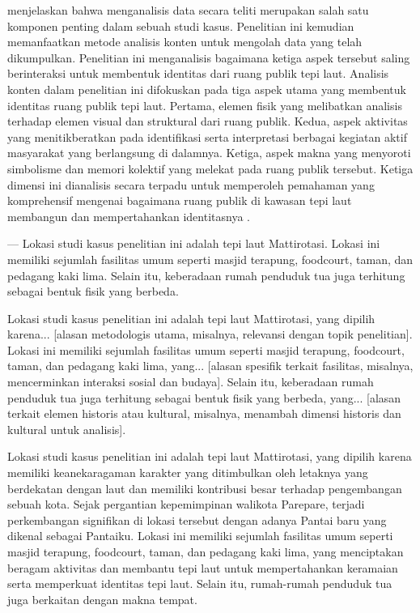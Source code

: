\documentclass[11pt]{simart} %
\begin{document}
\cite{wiraguna2024}  menjelaskan bahwa menganalisis data secara teliti merupakan salah satu komponen penting dalam sebuah studi kasus.
Penelitian ini kemudian memanfaatkan metode analisis konten untuk mengolah data yang telah dikumpulkan. Penelitian ini menganalisis bagaimana ketiga aspek tersebut saling berinteraksi untuk membentuk identitas dari ruang publik tepi laut.
Analisis konten dalam penelitian ini difokuskan pada tiga aspek utama yang membentuk identitas ruang publik tepi laut.
Pertama, elemen fisik yang melibatkan analisis terhadap elemen visual dan struktural dari ruang publik.
Kedua, aspek aktivitas yang menitikberatkan pada identifikasi serta interpretasi berbagai kegiatan aktif masyarakat yang berlangsung di dalamnya.
Ketiga, aspek makna yang menyoroti simbolisme dan memori kolektif yang melekat pada ruang publik tersebut.
Ketiga dimensi ini dianalisis secara terpadu untuk memperoleh pemahaman yang komprehensif mengenai bagaimana ruang publik di kawasan tepi laut membangun dan mempertahankan identitasnya \citep{iqbal2020,ujang2017}.

---
Lokasi studi kasus penelitian ini adalah tepi laut Mattirotasi. Lokasi ini memiliki sejumlah fasilitas umum seperti masjid terapung, foodcourt, taman, dan pedagang kaki lima. Selain itu, keberadaan rumah penduduk tua juga terhitung sebagai bentuk fisik yang berbeda.

Lokasi studi kasus penelitian ini adalah tepi laut Mattirotasi, yang dipilih karena... [alasan metodologis utama, misalnya, relevansi dengan topik penelitian]. Lokasi ini memiliki sejumlah fasilitas umum seperti masjid terapung, foodcourt, taman, dan pedagang kaki lima, yang... [alasan spesifik terkait fasilitas, misalnya, mencerminkan interaksi sosial dan budaya]. Selain itu, keberadaan rumah penduduk tua juga terhitung sebagai bentuk fisik yang berbeda, yang... [alasan terkait elemen historis atau kultural, misalnya, menambah dimensi historis dan kultural untuk analisis].

Lokasi studi kasus penelitian ini adalah tepi laut Mattirotasi, yang dipilih karena memiliki keanekaragaman karakter yang ditimbulkan oleh letaknya yang berdekatan dengan laut dan memiliki kontribusi besar terhadap pengembangan sebuah kota.
Sejak pergantian kepemimpinan walikota Parepare, terjadi perkembangan signifikan di lokasi tersebut dengan adanya Pantai baru yang dikenal sebagai Pantaiku.
Lokasi ini memiliki sejumlah fasilitas umum seperti masjid terapung, foodcourt, taman, dan pedagang kaki lima, yang menciptakan beragam aktivitas dan membantu tepi laut untuk mempertahankan keramaian serta memperkuat identitas tepi laut.
Selain itu, rumah-rumah penduduk tua juga berkaitan dengan makna tempat.
\end{document}
